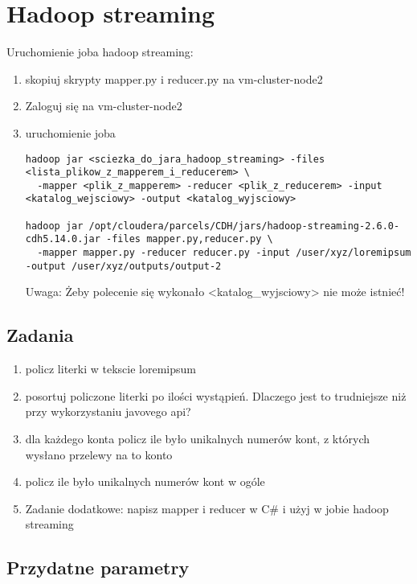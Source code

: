 \documentclass{article}
\begin{document}
\section*{Hadoop streaming}

Uruchomienie joba hadoop streaming:
\begin{enumerate}
\item skopiuj skrypty mapper.py i reducer.py na vm-cluster-node2
\item Zaloguj się na vm-cluster-node2
\item uruchomienie joba
\begin{lstlisting}[]
hadoop jar <sciezka_do_jara_hadoop_streaming> -files <lista_plikow_z_mapperem_i_reducerem> \
  -mapper <plik_z_mapperem> -reducer <plik_z_reducerem> -input <katalog_wejsciowy> -output <katalog_wyjsciowy>

hadoop jar /opt/cloudera/parcels/CDH/jars/hadoop-streaming-2.6.0-cdh5.14.0.jar -files mapper.py,reducer.py \
  -mapper mapper.py -reducer reducer.py -input /user/xyz/loremipsum -output /user/xyz/outputs/output-2
\end{lstlisting}

Uwaga: Żeby polecenie się wykonało <katalog\_wyjsciowy> nie może istnieć!
\end{enumerate}

\subsection*{Zadania}

\begin{enumerate}
\item policz literki w tekscie loremipsum
\item posortuj policzone literki po ilości wystąpień. Dlaczego jest to trudniejsze niż przy wykorzystaniu javovego api?
\item dla każdego konta policz ile było unikalnych numerów kont, z których wysłano przelewy na to konto
\item policz ile było unikalnych numerów kont w ogóle
\item Zadanie dodatkowe: napisz mapper i reducer w C\# i użyj w jobie hadoop streaming 
\end{enumerate}

\subsection*{Przydatne parametry}
\end{document}
